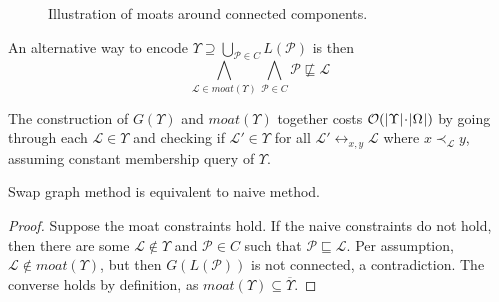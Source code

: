 \documentclass[12pt]{llncs}
\DeclarePairedDelimiter{\abs}{\lvert}{\rvert}
\newcommand{\poset}[1]{\mathcal{#1}}
\newcommand{\uni}[1][]{\Omega_{#1}}
\newcommand{\lang}[1]{L(#1)}
\newcommand{\swap}[1][]{\leftrightarrow_{#1}}
\newcommand{\sgraph}[1]{G(#1)}
\newcommand{\lext}{\sqsubseteq}
\newcommand{\covered}[1][]{\prec_{#1}}
\newcommand{\complmt}[1]{\overline{#1}}
\newcommand{\bigo}[1]{\mathcal{O}(#1)}
\begin{document}
\begin{figure}[h]
    \centering
    \caption{Illustration of moats around connected components.}
    \label{figure:moat}
\end{figure}

An alternative way to encode $\Upsilon \supseteq \bigcup_{\poset{P} \in C} \lang{\poset{P}}$ is then
\[
\bigwedge_{\poset{L} \in moat(\Upsilon)} \bigwedge_{\poset{P} \in C} \poset{P} \not\lext \poset{L}
\]

The construction of $\sgraph{\Upsilon}$ and $moat(\Upsilon)$ together costs $\bigo{\abs{\Upsilon} \!\cdot\! \abs{\uni}}$ by going through each $\poset{L} \!\in\! \Upsilon$ and checking if $\poset{L}' \!\in\! \Upsilon$ for all $\poset{L}' \swap[x,y] \poset{L}$ where $x \covered[\poset{L}] y$, assuming constant membership query of $\Upsilon$.

\begin{proposition}
    Swap graph method is equivalent to naive method.
\end{proposition}
\begin{proof}
    Suppose the moat constraints hold. If the naive constraints do not hold, then there are some $\poset{L} \!\notin\! \Upsilon$ and $\poset{P} \!\in\! C$ such that $\poset{P} \lext \poset{L}$. Per assumption, $\poset{L} \!\notin\! moat(\Upsilon)$, but then $\sgraph{\lang{\poset{P}}}$ is not connected, a contradiction. The converse holds by definition, as $moat(\Upsilon) \subseteq \complmt{\Upsilon}$.
\end{proof}
\end{document}
